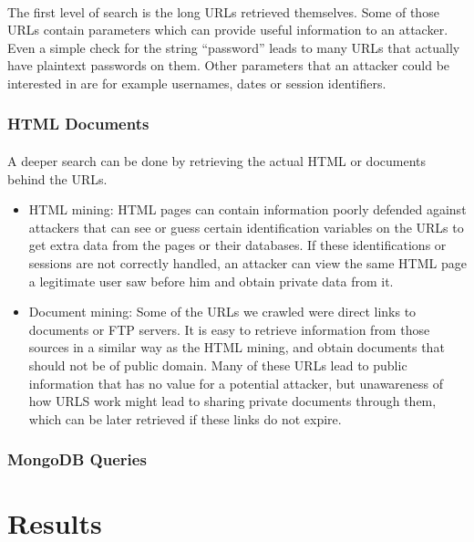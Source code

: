 \documentclass[12pt]{article}
\begin{document}
\paragraph{}
The first level of search is the long URLs retrieved themselves. Some of those URLs contain parameters which can provide useful information to an attacker. Even a simple check for the string “password” leads to many URLs that actually have plaintext passwords on them. Other parameters that an attacker could be interested in are for example usernames, dates or session identifiers.

\subsubsection{HTML Documents}

\paragraph{}
A deeper search can be done by retrieving the actual HTML or documents behind the URLs.

\begin{itemize}

\item  HTML mining: HTML pages can contain information poorly defended against attackers that can see or guess certain identification variables on the URLs to get extra data from the pages or their databases. If these identifications or sessions are not correctly handled, an attacker can view the same HTML page a legitimate user saw before him and obtain private data from it.

\item  Document mining: Some of the URLs we crawled were direct links to documents or FTP servers. It is easy to retrieve information from those sources in a similar way as the HTML mining, and obtain documents that should not be of public domain. Many of these URLs lead to public information that has no value for a potential attacker, but unawareness of how URLS work might lead to sharing private documents through them, which can be later retrieved if these links do not expire.

\end{itemize}

\subsubsection{MongoDB Queries}

\section{Results}
\end{document}
